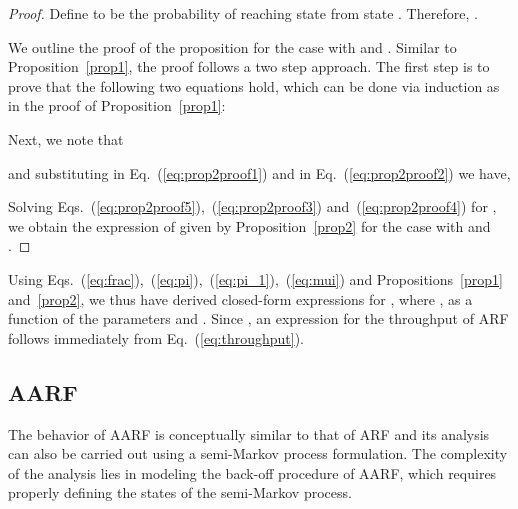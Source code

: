 \documentclass[11pt, journal, letterpaper, oneside, onecolumn]{IEEEtran}
\begin{document}
\begin{proof}

Define  to be the probability of reaching state
 from state . Therefore,
.

We outline the proof of the proposition for the case  with
 and . Similar to Proposition~\ref{prop1}, the proof
follows a two step approach. The first step is to prove that the
following two equations hold, which can be done via induction as
in the proof of Proposition~\ref{prop1}:



Next, we note that

and substituting  in Eq.~(\ref{eq:prop2proof1}) and 
in Eq.~(\ref{eq:prop2proof2}) we have,







Solving Eqs.~(\ref{eq:prop2proof5}),~(\ref{eq:prop2proof3})
and~(\ref{eq:prop2proof4}) for , we obtain the
expression of  given by Proposition~\ref{prop2} for the
case  with  and .

\end{proof}

Using
Eqs.~(\ref{eq:frac}),~(\ref{eq:pi}),~(\ref{eq:pi_1}),~(\ref{eq:mui})
and Propositions~\ref{prop1} and~\ref{prop2}, we thus have derived
closed-form expressions for , where , as a
function of the parameters 
and . Since , an expression for the throughput of ARF
follows immediately from Eq.~(\ref{eq:throughput}).




\subsection{AARF}
\label{sec:AARF}

The behavior of AARF is conceptually similar to that of ARF and
its analysis can also be carried out using a semi-Markov process
formulation. The complexity of the analysis lies in modeling the
back-off procedure of AARF, which requires properly defining the
states of the semi-Markov process.
\end{document}
